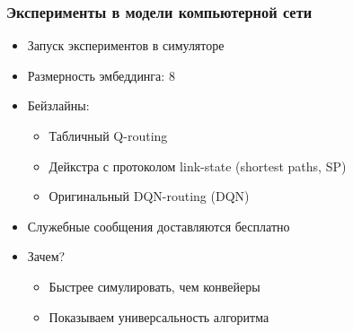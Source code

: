\documentclass{beamer}
\begin{document}

\begin{frame}
  \frametitle{Эксперименты в модели компьютерной сети}
  \begin{itemize}
  \item Запуск экспериментов в симуляторе
  \item Размерность эмбеддинга: 8
  \item Бейзлайны:
    \begin{itemize}
    \item Табличный Q-routing
    \item Дейкстра с протоколом link-state (shortest paths, SP)
    \item Оригинальный DQN-routing (DQN)
    \end{itemize}
  \item Служебные сообщения доставляются бесплатно
  \item Зачем?
    \begin{itemize}
    \item Быстрее симулировать, чем конвейеры
    \item Показываем универсальность алгоритма
    \end{itemize}
  \end{itemize}
\end{frame}
\end{document}
